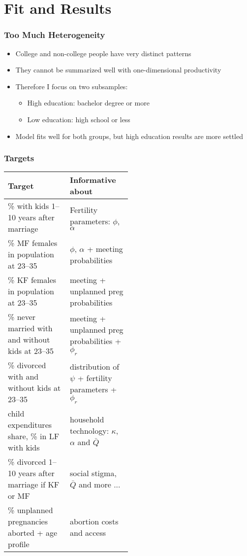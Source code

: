 \documentclass[aspectratio=169]{beamer}
\let\olditem\item
\renewcommand{\item}{%
\olditem\vspace{\fill}}
\begin{document}
\section{Fit and Results}

\begin{frame}
\frametitle{Too Much Heterogeneity}
\begin{itemize}
\item College and non-college people have very distinct patterns
\item They cannot be summarized well with one-dimensional productivity
\item Therefore I focus on two subsamples:
\begin{itemize}
\item High education: bachelor degree or more
\item Low education: high school or less
\end{itemize}
\item Model fits well for both groups, but high education results are more settled
\end{itemize}
\end{frame}

\begin{frame}
\frametitle{Targets}
\begin{tabular}{l p{0.5\linewidth}}\hline
\multicolumn{1}{l}{Target} & \multicolumn{1}{l}{Informative about} \\\hline
\footnotesize \% with kids 1--10 years after marriage & \footnotesize  Fertility parameters: $\phi$, $\alpha$ \\
\footnotesize \% MF females in population at 23--35 & \footnotesize  $\phi$, $\alpha$ + meeting probabilities \\
\footnotesize \% KF females in population at 23--35 &\footnotesize   meeting + unplanned preg probabilities\\
\footnotesize \% never married with and without kids at 23--35 & \footnotesize  meeting + unplanned preg probabilities + $\phi_r$\\
\footnotesize \% divorced with and without kids at 23--35 & \footnotesize  distribution of $\psi$ + fertility parameters + $\phi_r$ \\
\footnotesize child expenditures share, \% in LF with kids & \footnotesize  household technology: $\kappa$, $\alpha$ and $\bar{Q}$ \\
\footnotesize \% divorced 1--10 years after marriage if KF or MF & \footnotesize  social stigma, $\bar{Q}$ and more ... \\
\footnotesize \% unplanned pregnancies aborted + age profile & \footnotesize  abortion costs and access \\\hline
\end{tabular}
\end{frame}
\end{document}
